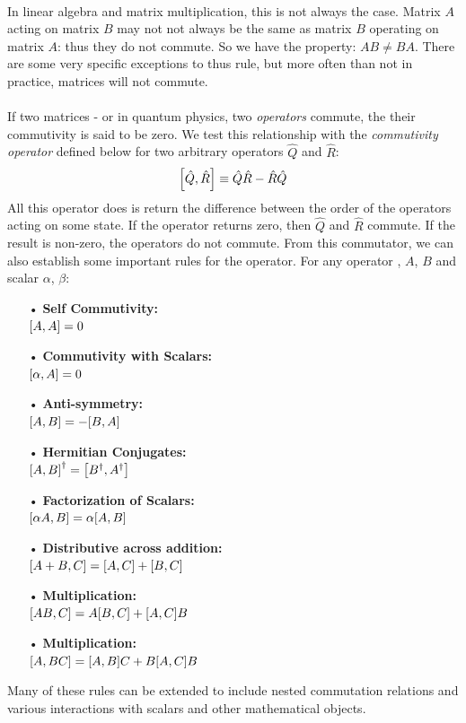 \documentclass[12pt,letterpaper]{book}
\begin{document}
\paragraph*{}In linear algebra and matrix multiplication, this is not always the case. Matrix $A$ acting on matrix $B$ may not not always be the same as matrix $B$ operating on matrix $A$: thus they do not commute. So we have the property: $AB \neq BA$. There are some very specific exceptions to thus rule, but more often than not in practice, matrices will not commute.
\paragraph*{}If two matrices - or in quantum physics, two \textit{operators} commute, the their commutivity is said to be zero. We test this relationship with the \textit{commutivity operator} defined below for two arbitrary operators $\hat{Q}$ and $\hat{R}$:
\begin{equation}
\label{commutator operator}
\comm{\hat{Q}}{\hat{R}} \equiv \hat{Q}\hat{R} - \hat{R}\hat{Q}
\end{equation}
All this operator does is return the difference between the order of the operators acting on some state. If the operator returns zero, then $\hat{Q}$ and $\hat{R}$ commute. If the result is non-zero, the operators do not commute. From this commutator, we can also establish some important rules for the operator. For any operator , $A$, $B$ and scalar $\alpha$, $\beta$:
\begin{multicols}{2}
\begin{itemize}
\item[•]\textbf{Self Commutivity:}\\
$ \comm{A}{A} = 0$
\item[•]\textbf{Commutivity with Scalars:}\\
$\comm{\alpha}{A} = 0$
\item[•]\textbf{Anti-symmetry:}\\
$ \comm{A}{B} = -\comm{B}{A} $
\item[•]\textbf{Hermitian Conjugates:}\\
$\comm{A}{B}^\dagger  = \comm{B^\dagger}{A^\dagger} $

\columnbreak

\item[•]\textbf{Factorization of Scalars:}\\
$\comm{\alpha A}{B} = \alpha \comm{A}{B}$
\item[•]\textbf{Distributive across addition:}\\
$\comm{A+B}{C} = \comm{A}{C} + \comm{B}{C}$
\item[•]\textbf{Multiplication:}\\
$\comm{AB}{C} = A\comm{B}{C} + \comm{A}{C}B$
\item[•]\textbf{Multiplication:}\\
$\comm{A}{BC} = \comm{A}{B}C + B\comm{A}{C}B$
\end{itemize}
\end{multicols}
Many of these rules can be extended to include nested commutation relations and various interactions with scalars and other mathematical objects.
\end{document}
